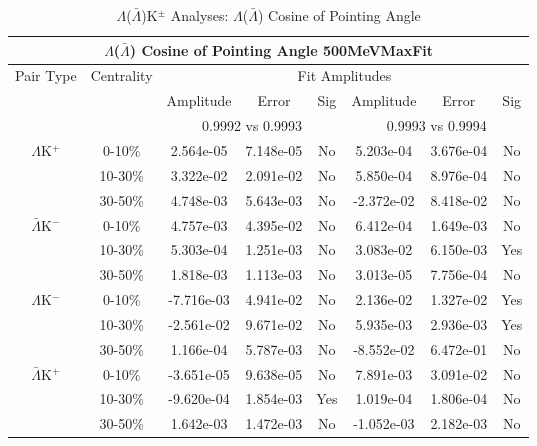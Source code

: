 \documentclass[../AnalysisNoteJBuxton.tex]{subfiles}
\begin{document}
\begin{table}
 \centering
 \begin{tabular}{|c|c|c|c|c||c|c|c|}
  \multicolumn{8}{c}{$\Lambda$($\bar{\Lambda}$) Cosine of Pointing Angle 500MeVMaxFit} \\
  \hline
  \multirow{3}{*}{Pair Type} & \multirow{3}{*}{Centrality} & \multicolumn{6}{c|}{Fit Amplitudes} \\
  \cline{3-8}
   & & Amplitude & Error & Sig & Amplitude & Error & Sig \\  
  \cline{3-8}
   & & \multicolumn{3}{c||}{0.9992 vs 0.9993} & \multicolumn{3}{c|}{0.9993 vs 0.9994} \\  
  \hline
  \multirow{3}{*}{$\Lambda$K$^{+}$}
   &  0-10\% & 2.564e-05 & 7.148e-05 & No & 5.203e-04 & 3.676e-04 & No \\
   & 10-30\% & 3.322e-02 & 2.091e-02 & No & 5.850e-04 & 8.976e-04 & No \\
   & 30-50\% & 4.748e-03 & 5.643e-03 & No & -2.372e-02 & 8.418e-02 & No \\
  \hline
  \multirow{3}{*}{$\bar{\Lambda}$K$^{-}$}
   &  0-10\% & 4.757e-03 & 4.395e-02 & No & 6.412e-04 & 1.649e-03 & No \\
   & 10-30\% & 5.303e-04 & 1.251e-03 & No & 3.083e-02 & 6.150e-03 & Yes \\
   & 30-50\% & 1.818e-03 & 1.113e-03 & No & 3.013e-05 & 7.756e-04 & No \\
  \hline \hline
  \multirow{3}{*}{$\Lambda$K$^{-}$}
   &  0-10\% & -7.716e-03 & 4.941e-02 & No & 2.136e-02 & 1.327e-02 & Yes \\
   & 10-30\% & -2.561e-02 & 9.671e-02 & No & 5.935e-03 & 2.936e-03 & Yes \\
   & 30-50\% & 1.166e-04 & 5.787e-03 & No & -8.552e-02 & 6.472e-01 & No \\
  \hline
  \multirow{3}{*}{$\bar{\Lambda}$K$^{+}$}
   &  0-10\% & -3.651e-05 & 9.638e-05 & No & 7.891e-03 & 3.091e-02 & No \\
   & 10-30\% & -9.620e-04 & 1.854e-03 & Yes & 1.019e-04 & 1.806e-04 & No \\
   & 30-50\% & 1.642e-03 & 1.472e-03 & No & -1.052e-03 & 2.182e-03 & No \\
  \hline
 \end{tabular}
 \caption{$\Lambda$($\bar{\Lambda}$)K$^{\pm}$ Analyses: $\Lambda$($\bar{\Lambda}$) Cosine of Pointing Angle}
 \label{tab:LamCosPointingAngleLamKch_500MeVMaxFit}
\end{table}
\end{document}
